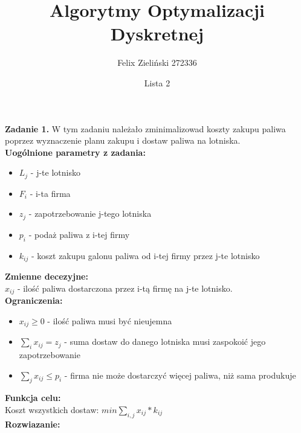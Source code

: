 \documentclass[15pt, a4paper]{article}
\title{Algorytmy Optymalizacji Dyskretnej}
\author{Felix Zieliński 272336}
\date{Lista 2}
\begin{document}
\maketitle

\noindent\hrulefill

\vspace{0.5cm}


\noindent\textbf{Zadanie 1.} W tym zadaniu należało zminimalizowad koszty zakupu paliwa poprzez wyznaczenie planu zakupu i dostaw paliwa na lotniska.\\

\noindent\textbf{Uogólnione parametry z zadania:}

\begin{itemize}
    \item \( L_j \) - j-te lotnisko
    \item \( F_i \) - i-ta firma
    \item \( z_j \) - zapotrzebowanie j-tego lotniska
    \item \( p_i \) - podaż paliwa z i-tej firmy
    \item \( k_{ij} \) - koszt zakupu galonu paliwa od i-tej firmy przez j-te lotnisko
\end{itemize}

\noindent\textbf{Zmienne decezyjne:}\\

\(x_{ij}\) - ilość paliwa dostarczona przez i-tą firmę na j-te lotnisko.\\

\noindent\textbf{Ograniczenia:}

\begin{itemize}
    \item \(x_{ij} \geq 0 \) - ilość paliwa musi być nieujemna
    \item \(\sum_{i}x_{ij} = z_j\)  - suma dostaw do danego lotniska musi zaspokoić jego zapotrzebowanie 
    \item \(\sum_{j}x_{ij} \leq p_i \) - firma nie może dostarczyć więcej paliwa, niż sama produkuje
\end{itemize}

\noindent\textbf{Funkcja celu:}\\

Koszt wszystkich dostaw: \(min \sum_{i, j}x_{ij} * k_{ij} \)\\

\noindent\textbf{Rozwiazanie:}\\ 
\end{document}
